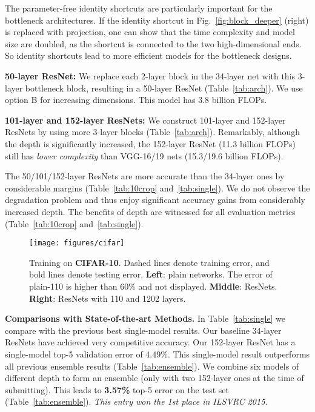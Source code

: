 The parameter-free identity shortcuts are particularly important for the bottleneck architectures. If the identity shortcut in Fig.~\ref{fig:block_deeper} (right) is replaced with projection, one can show that the time complexity and model size are doubled, as the shortcut is connected to the two high-dimensional ends. So identity shortcuts lead to more efficient models for the bottleneck designs.

\textbf{50-layer ResNet:} We replace each 2-layer block in the 34-layer net with this 3-layer bottleneck block, resulting in a 50-layer ResNet (Table~\ref{tab:arch}). We use option B for increasing dimensions.
This model has 3.8 billion FLOPs.

\textbf{101-layer and 152-layer ResNets:} We construct 101-layer and 152-layer ResNets by using more 3-layer blocks (Table~\ref{tab:arch}).
Remarkably, although the depth is significantly increased, the 152-layer ResNet (11.3 billion FLOPs) still has \emph{lower complexity} than VGG-16/19 nets (15.3/19.6 billion FLOPs).

The 50/101/152-layer ResNets are more accurate than the 34-layer ones by considerable margins (Table~\ref{tab:10crop} and~\ref{tab:single}). We do not observe the degradation problem and thus enjoy significant accuracy gains from considerably increased depth. The benefits of depth are witnessed for all evaluation metrics (Table~\ref{tab:10crop} and~\ref{tab:single}).

\begin{figure*}[t]
\begin{center}
\texttt{[image: figures/cifar]}
\end{center}
\vspace{-1.5em}
\caption{Training on \textbf{CIFAR-10}. Dashed lines denote training error, and bold lines denote testing error. \textbf{Left}: plain networks. The error of plain-110 is higher than 60\% and not displayed. \textbf{Middle}: ResNets. \textbf{Right}: ResNets with 110 and 1202 layers.}
\label{fig:cifar}
\end{figure*}

\vspace{6pt}
\noindent\textbf{Comparisons with State-of-the-art Methods.}
In Table~\ref{tab:single} we compare with the previous best single-model results.
Our baseline 34-layer ResNets have achieved very competitive accuracy.
Our 152-layer ResNet has a single-model top-5 validation error of 4.49\%. This single-model result outperforms all previous ensemble results (Table~\ref{tab:ensemble}).
We combine six models of different depth to form an ensemble (only with two 152-layer ones at the time of submitting). This leads to \textbf{3.57\%} top-5 error on the test set (Table~\ref{tab:ensemble}). \emph{This entry won the 1st place in ILSVRC 2015.}


